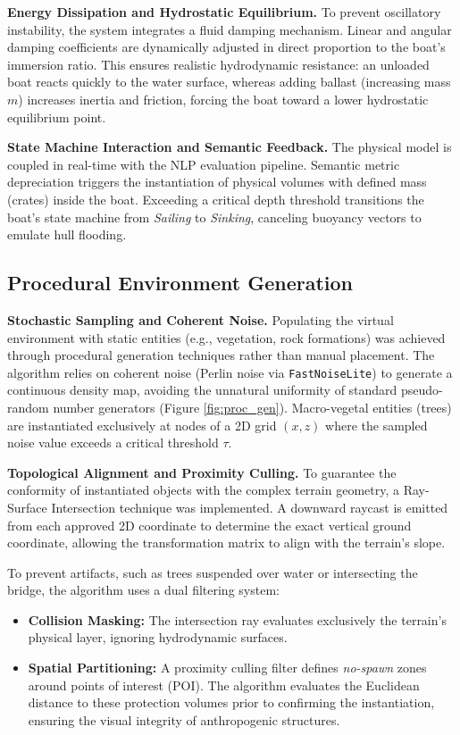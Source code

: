 \textbf{Energy Dissipation and Hydrostatic Equilibrium.} To prevent oscillatory instability, the system integrates a fluid damping mechanism. Linear and angular damping coefficients are dynamically adjusted in direct proportion to the boat's immersion ratio. This ensures realistic hydrodynamic resistance: an unloaded boat reacts quickly to the water surface, whereas adding ballast (increasing mass $m$) increases inertia and friction, forcing the boat toward a lower hydrostatic equilibrium point.

\textbf{State Machine Interaction and Semantic Feedback.} The physical model is coupled in real-time with the NLP evaluation pipeline. Semantic metric depreciation triggers the instantiation of physical volumes with defined mass (crates) inside the boat. Exceeding a critical depth threshold transitions the boat's state machine from \textit{Sailing} to \textit{Sinking}, canceling buoyancy vectors to emulate hull flooding.

\subsection{Procedural Environment Generation}

\textbf{Stochastic Sampling and Coherent Noise.} Populating the virtual environment with static entities (e.g., vegetation, rock formations) was achieved through procedural generation techniques rather than manual placement. The algorithm relies on coherent noise (Perlin noise via \texttt{FastNoiseLite}) \cite{ebert2003texturing} to generate a continuous density map, avoiding the unnatural uniformity of standard pseudo-random number generators (Figure \ref{fig:proc_gen}). Macro-vegetal entities (trees) are instantiated exclusively at nodes of a 2D grid $(x, z)$ where the sampled noise value exceeds a critical threshold $\tau$.

\textbf{Topological Alignment and Proximity Culling.} To guarantee the conformity of instantiated objects with the complex terrain geometry, a Ray-Surface Intersection technique was implemented. A downward raycast is emitted from each approved 2D coordinate to determine the exact vertical ground coordinate, allowing the transformation matrix to align with the terrain's slope.

To prevent artifacts, such as trees suspended over water or intersecting the bridge, the algorithm uses a dual filtering system:
\begin{itemize}
    \item \textbf{Collision Masking:} The intersection ray evaluates exclusively the terrain's physical layer, ignoring hydrodynamic surfaces.
    \item \textbf{Spatial Partitioning:} A proximity culling filter defines \textit{no-spawn} zones around points of interest (POI). The algorithm evaluates the Euclidean distance to these protection volumes prior to confirming the instantiation, ensuring the visual integrity of anthropogenic structures.
\end{itemize}
